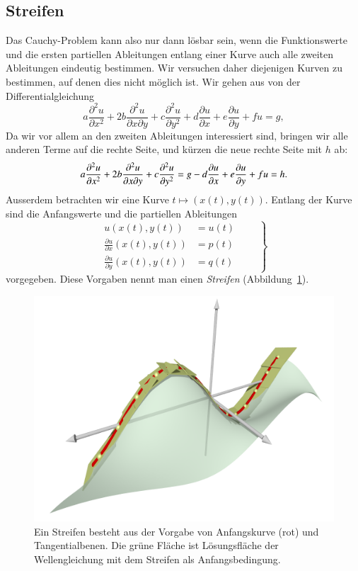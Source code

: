 \subsection{Streifen}
Das Cauchy-Problem kann also nur dann lösbar sein, wenn die Funktionswerte
und die ersten partiellen Ableitungen entlang einer Kurve
auch alle zweiten Ableitungen eindeutig bestimmen.
Wir versuchen daher
diejenigen Kurven zu bestimmen, auf denen dies nicht möglich ist.
Wir gehen aus von der Differentialgleichung
\begin{equation}
a\frac{\partial^2 u}{\partial x^2}
+
2b\frac{\partial^2 u}{\partial x\partial y}
+
c\frac{\partial^2 u}{\partial y^2}
+
d\frac{\partial u}{\partial x}
+
e\frac{\partial u}{\partial y}
+
fu
=g,
\label{charequation}
\end{equation}
Da wir vor allem an den zweiten Ableitungen interessiert sind, bringen
wir alle anderen Terme auf die rechte Seite, und kürzen die neue
rechte Seite mit $h$ ab:
\begin{equation}
a\frac{\partial^2 u}{\partial x^2}
+
2b\frac{\partial^2 u}{\partial x\partial y}
+
c\frac{\partial^2 u}{\partial y^2}
=
g
-
d\frac{\partial u}{\partial x}
+
e\frac{\partial u}{\partial y}
+
fu
=h.
\notag
\end{equation}
Ausserdem betrachten wir eine Kurve
$t\mapsto(x(t),y(t))$.
Entlang der Kurve sind die Anfangswerte
und die partiellen Ableitungen
\begin{equation}
\left.
\begin{aligned}
u(x(t),y(t))&=u(t)\\
\frac{\partial u}{\partial x}(x(t),y(t)) &= p(t)\\
\frac{\partial u}{\partial y}(x(t),y(t)) &= q(t)
\end{aligned}
\qquad
\right\}
\label{charanfangs}
\end{equation}
vorgegeben. Diese Vorgaben nennt man einen {\em Streifen}
(Abbildung~\ref{skript:streifen}).

\begin{figure}
\centering
\includegraphics[width=\hsize]{../common/3d/streifen0.png}
\caption{Ein Streifen besteht aus der Vorgabe von Anfangskurve (rot)
und Tangentialbenen.
Die grüne Fläche ist Lösungsfläche der Wellengleichung mit 
dem Streifen als Anfangsbedingung.
\label{skript:streifen}}
\end{figure}

